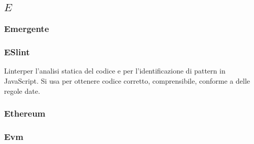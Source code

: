 \subsection*{\quad$E\quad$}

\subsubsection*{Emergente}

\subsubsection*{ESlint}
Linter\glo per l’analisi statica del codice e per l’identificazione di pattern in JavaScript. Si usa per ottenere codice corretto, comprensibile, conforme a delle regole date.

\subsubsection*{Ethereum}

\subsubsection*{Evm}

